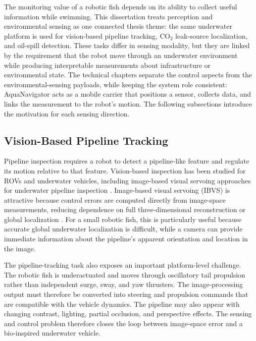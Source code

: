 \documentclass{uhcoethesis}
\begin{document}
The monitoring value of a robotic fish depends on its ability to collect useful information while swimming. This dissertation treats perception and environmental sensing as one connected thesis theme: the same underwater platform is used for vision-based pipeline tracking, \mbox{CO$_2$} leak-source localization, and oil-spill detection. These tasks differ in sensing modality, but they are linked by the requirement that the robot move through an underwater environment while producing interpretable measurements about infrastructure or environmental state. The technical chapters separate the control aspects from the environmental-sensing payloads, while keeping the system role consistent: AquaNavigator acts as a mobile carrier that positions a sensor, collects data, and links the measurement to the robot's motion. The following subsections introduce the motivation for each sensing direction.

\subsection{Vision-Based Pipeline Tracking}

Pipeline inspection requires a robot to detect a pipeline-like feature and regulate its motion relative to that feature. Vision-based inspection has been studied for ROVs and underwater vehicles, including image-based visual servoing approaches for underwater pipeline inspection \cite{Yi2023}. Image-based visual servoing (IBVS) is attractive because control errors are computed directly from image-space measurements, reducing dependence on full three-dimensional reconstruction or global localization \cite{Reynolds1999}. For a small robotic fish, this is particularly useful because accurate global underwater localization is difficult, while a camera can provide immediate information about the pipeline's apparent orientation and location in the image.

The pipeline-tracking task also exposes an important platform-level challenge. The robotic fish is underactuated and moves through oscillatory tail propulsion rather than independent surge, sway, and yaw thrusters. The image-processing output must therefore be converted into steering and propulsion commands that are compatible with the vehicle dynamics. The pipeline may also appear with changing contrast, lighting, partial occlusion, and perspective effects. The sensing and control problem therefore closes the loop between image-space error and a bio-inspired underwater vehicle.
\end{document}
